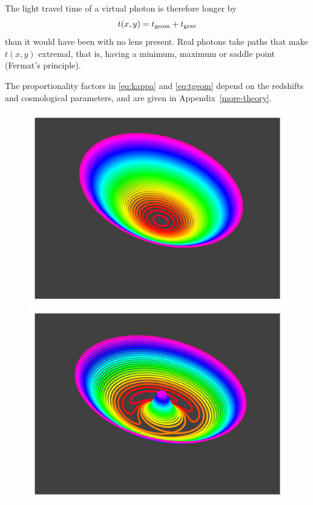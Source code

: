 \documentclass[usenatbib]{mn2e}
\begin{document}
The light travel time of a virtual photon is therefore longer by
\begin{equation}  \label{eq:tarriv}
t(x,y) = t_{\rm geom} + t_{\rm grav}
\end{equation}
than it would have been with no lens present.  Real photons take paths
that make $t(x,y)$ extremal, that is, having a minimum, maximum or
saddle point (Fermat's principle).

The proportionality factors in \eqref{eq:kappa} and \eqref{eq:tgeom}
depend on the redshifts and cosmological parameters, and are given in
Appendix~\ref{more-theory}.

\begin{figure}
\centering
\includegraphics[width=\columnwidth]{fig/arriv_0}
\includegraphics[width=\columnwidth]{fig/arriv_1}

\end{figure}
\end{document}
